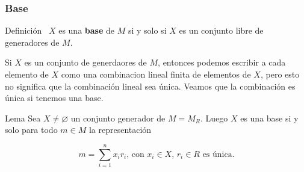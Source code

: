 \documentclass[notes=show]{beamer}%
\newenvironment{Defi}{\begin{block}{Definición}}{\end{block}}
\newenvironment{Lema}{\begin{block}{Lema}}{\end{block}}
\begin{document}
\begin{frame}%


\bigskip%
\frametitle{Base}%


\begin{Defi}
\bigskip\ $X$ es una \textbf{base }de $M$ si y solo si $X$ es un conjunto
libre de generadores de $M$.
\end{Defi}

Si $X$ es un conjunto de generdaores de $M$, entonces podemos escribir a cada
elemento de $X$ como una combinacion lineal finita de elementos de $X$, pero
esto no significa que la combinación lineal sea única. Veamos que la
combinación es única si tenemos una base.

\begin{Lema}
Sea $X\neq\varnothing$ un conjunto generador de $M=M_{R}$. Luego $X$ es una
base si y solo para todo $m\in M$ la representación%

\[
m=%
{\displaystyle\sum\limits_{i=1}^{n}}
x_{i}r_{i}\text{, con }x_{i}\in X\text{, }r_{i}\in R\text{ es única.}%
\]

\end{Lema}

\bigskip%

\transboxout
\end{frame}%


\bigskip%
\end{document}
